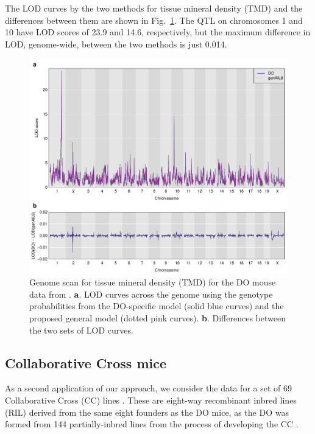 \documentclass[12pt,letterpaper]{article}\usepackage[]{graphicx}\usepackage[table]{xcolor}
\begin{document}
The LOD curves by the two methods for tissue mineral density (TMD) and
the differences between them are shown in Fig.~\ref{fig3_do_qtl}. The
QTL on chromosomes 1 and 10 have LOD scores of
23.9
and 14.6,
respectively, but the maximum difference in LOD, genome-wide, between the two
methods is just 0.014.


\begin{figure}
\centering
\includegraphics[width=\textwidth]{Figs/fig3_do_qtl.pdf}

\caption{Genome scan for tissue mineral density (TMD) for the DO mouse data
  from \citet{albarghouthi2021}. \textbf{a}. LOD curves across the
  genome using the genotype probabilities from the DO-specific model
  (solid blue curves) and the proposed general model (dotted pink
  curves). \textbf{b}. Differences between the two sets of LOD curves.
  \label{fig3_do_qtl}}
\end{figure}





\subsection*{Collaborative Cross mice}



As a second application of our approach, we consider the data for a
set of 69 Collaborative Cross (CC) lines \citep{srivastava2017}. These are
eight-way recombinant inbred lines (RIL) derived from the same eight
founders as the DO mice, as the DO was formed from 144
partially-inbred lines from the process of developing the CC
\citep{svenson2012}.
\end{document}
